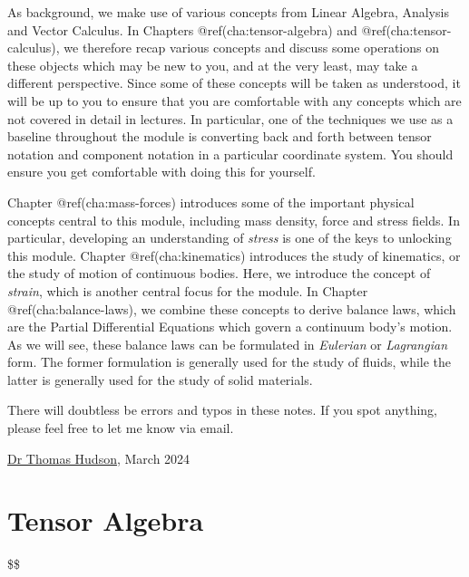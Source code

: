 \documentclass[
  letterpaper,
  DIV=11,
  numbers=noendperiod]{scrreprt}
\theoremstyle{plain}
\theoremstyle{remark}
\begin{document}
As background, we make use of various concepts from Linear Algebra,
Analysis and Vector Calculus. In Chapters @ref(cha:tensor-algebra) and
@ref(cha:tensor-calculus), we therefore recap various concepts and
discuss some operations on these objects which may be new to you, and at
the very least, may take a different perspective. Since some of these
concepts will be taken as understood, it will be up to you to ensure
that you are comfortable with any concepts which are not covered in
detail in lectures. In particular, one of the techniques we use as a
baseline throughout the module is converting back and forth between
tensor notation and component notation in a particular coordinate
system. You should ensure you get comfortable with doing this for
yourself.

Chapter @ref(cha:mass-forces) introduces some of the important physical
concepts central to this module, including mass density, force and
stress fields. In particular, developing an understanding of
\emph{stress} is one of the keys to unlocking this module. Chapter
@ref(cha:kinematics) introduces the study of kinematics, or the study of
motion of continuous bodies. Here, we introduce the concept of
\emph{strain}, which is another central focus for the module. In Chapter
@ref(cha:balance-laws), we combine these concepts to derive balance
laws, which are the Partial Differential Equations which govern a
continuum body's motion. As we will see, these balance laws can be
formulated in \emph{Eulerian} or \emph{Lagrangian} form. The former
formulation is generally used for the study of fluids, while the latter
is generally used for the study of solid materials.

There will doubtless be errors and typos in these notes. If you spot
anything, please feel free to let me know via email.

\href{https://sites.google.com/view/thudso/}{Dr Thomas Hudson}, March
2024


\chapter{Tensor Algebra}\label{sec-tensor-algebra}

\$\$ \newcommand{\bfa}{{\boldsymbol{a}}}
\newcommand{\bfb}{{\boldsymbol{b}}} \newcommand{\bfc}{{\boldsymbol{c}}}
\newcommand{\bfd}{{\boldsymbol{d}}} \newcommand{\bfe}{{\boldsymbol{e}}}
\newcommand{\bff}{{\boldsymbol{f}}} \newcommand{\bfg}{{\boldsymbol{g}}}
\newcommand{\bfh}{{\boldsymbol{h}}} \newcommand{\bfi}{{\boldsymbol{i}}}
\newcommand{\bfj}{{\boldsymbol{j}}} \newcommand{\bfk}{{\boldsymbol{k}}}
\newcommand{\bfl}{{\boldsymbol{l}}} \newcommand{\bfm}{{\boldsymbol{m}}}
\newcommand{\bfn}{{\boldsymbol{n}}} \newcommand{\bfo}{{\boldsymbol{o}}}
\newcommand{\bfp}{{\boldsymbol{p}}} \newcommand{\bfq}{{\boldsymbol{q}}}
\newcommand{\bfr}{{\boldsymbol{r}}} \newcommand{\bfs}{{\boldsymbol{s}}}
\newcommand{\bft}{{\boldsymbol{t}}} \newcommand{\bfu}{{\boldsymbol{u}}}
\newcommand{\bfv}{{\boldsymbol{v}}} \newcommand{\bfw}{{\boldsymbol{w}}}
\newcommand{\bfx}{{\boldsymbol{x}}} \newcommand{\bfy}{{\boldsymbol{y}}}
\newcommand{\bfz}{{\boldsymbol{z}}}
\end{document}
